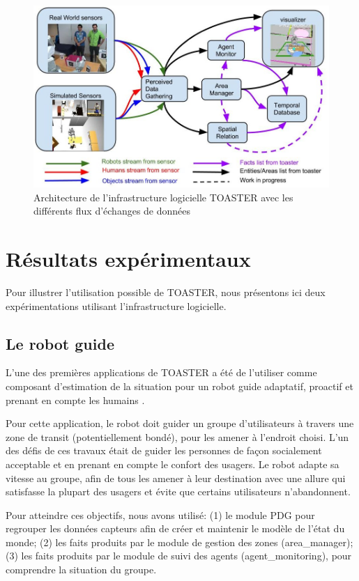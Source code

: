 \documentclass[a4paper,11pt,twoside]{StyleThese}
\begin{document}
\begin{figure}[ht!]
 \centering
  \includegraphics[width=0.99\linewidth]{./img/toasterArch2.jpg} 
  \caption {Architecture de l'infrastructure logicielle TOASTER avec les différents flux d'échanges de données}
  \label{fig:toasterArch}
\end{figure}

\section{Résultats expérimentaux}
Pour illustrer l'utilisation possible de TOASTER, nous présentons ici deux expérimentations utilisant l'infrastructure logicielle.

\subsection{Le robot guide}

L'une des premières applications de TOASTER a été de l'utiliser comme composant d'estimation de la situation pour un robot guide adaptatif, proactif et prenant en compte les humains \cite{fioreicsr2015}.

Pour cette application, le robot doit guider un groupe d'utilisateurs à travers une zone de transit (potentiellement bondé), pour les amener à l'endroit choisi.
L'un des défis de ces travaux était de guider les personnes de façon socialement acceptable et en prenant en compte le confort des usagers.
Le robot adapte sa vitesse au groupe, afin de tous les amener à leur destination avec une allure qui satisfasse la plupart des usagers et évite que certains utilisateurs n'abandonnent.

Pour atteindre ces objectifs, nous avons utilisé: (1) le module PDG pour regrouper les données capteurs afin de créer et maintenir le modèle de l'état du monde; (2) les faits produits par le module de gestion des zones (area\_manager); (3) les faits produits par le module de suivi des agents (agent\_monitoring), pour comprendre la situation du groupe. 
\end{document}
